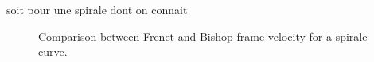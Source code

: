 soit pour une spirale dont on connait

\begin{figure}[t]
\centering
  	 \hspace{0.5cm}
	\caption[]{Comparison between Frenet and Bishop frame velocity for a spirale curve.}
	\label{fig:frame_bench}
\end{figure}


